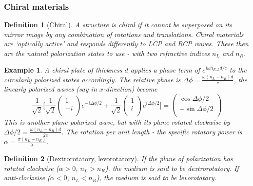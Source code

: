 \documentclass[a4paper]{article}
\newtheorem{eg}{Example}[section]
\theoremstyle{new}
\newtheorem{defi}{Definition}[section]
\begin{document}
\subsubsection{Chiral materials}
\begin{defi}[Chiral]
A structure is chiral if it cannot be superposed on its mirror image by any combination of rotations and translations. Chiral materials are `optically active' and responds differently to LCP and RCP waves. These then are the natural polarization states to use - with two refractive indices $n_L$ and $n_R$.
\end{defi}
\begin{eg}
A chiral plate of thickness $d$ applies a phase term of $e^{i\omega n_{R,L}d/c}$ to the circularly polarized states accordingly. The relative phase is $\Delta\phi=\frac{\omega(n_L-n_R)d}{c}$, the linearly polarized waves (say in $x$-direction) become
$$\frac{1}{\sqrt{2}}\bigg[\frac{1}{\sqrt{2}}\begin{pmatrix}1\\-i\\\end{pmatrix}e^{-i\Delta\phi/2}+\frac{1}{\sqrt{2}}\begin{pmatrix}1\\i\\\end{pmatrix}e^{i\Delta\phi/2}\bigg]=\begin{pmatrix}\cos\Delta\phi/2\\-\sin\Delta\phi/2\\\end{pmatrix}$$
This is another plane polarized wave, but with its plane rotated clockwise by $\Delta\phi/2=\frac{\omega(n_L-n_R)d}{2c}$. The rotation per unit length - the specific rotatory power is $\alpha=\frac{\pi(n_L-n_R)}{\lambda}$.
\end{eg}
\begin{defi}[Dextrorotatory, levorotatory]
If the plane of polarization has rotated clockwise ($\alpha>0$, $n_L>n_R$), the medium is said to be dextrorotatory. If anti-clockwise ($\alpha<0$, $n_L<n_R$), the medium is said to be levorotatory.
\end{defi}
\end{document}

